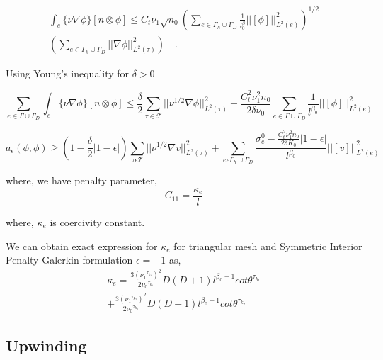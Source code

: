\documentclass[a4paper]{book}
\begin{document}
\begin{equation}
\begin{split}
\int_e \lbrace \nu \nabla \phi \rbrace[n \otimes \phi] \leq C_t \nu_1 \sqrt{n_0} \left( \sum_{e \in \Gamma_h \cup \Gamma_D} \frac{1}{l^\beta_0} ||[\phi]||^2_{L^2(e)} \right)^{1/2} \\ \left( \sum_{e \in \Gamma_h \cup \Gamma_D} ||\nabla \phi||^2_{L^2(\tau)} \right) \quad \textrm{.}
\end{split}
\end{equation}

Using Young's inequality for $\delta > 0$

\begin{equation}
\sum_{e \in \Gamma \cup \Gamma_D} \int_e \lbrace \nu \nabla \phi \rbrace [n \otimes \phi] \leq \frac{\delta}{2} \sum_{\tau \in \mathcal{T}} ||\nu^{1/2} \nabla \phi ||^2_{L^2(\tau)} +  \frac{C_t^2 \nu_1^2 n_0}{2 \delta \nu_0}  \sum_{e \in \Gamma \cup \Gamma_D} \frac{1}{l^{\beta_0}} ||[\phi]||^2_{L^2(e)}
\end{equation}


\begin{equation}
a_\epsilon (\phi , \phi) \geq \left( 1-\frac{\delta}{2} |1-\epsilon| \right) \sum_{\tau \epsilon \mathcal{T}} ||\nu^{1/2} \nabla v ||^2_{L^2(\tau)} + \sum_{e \epsilon \Gamma_h \cup \Gamma_D} \frac{\sigma_e^0 - \frac{C_t^2 \nu_1^2 n_0}{2 \delta K_0}|1-\epsilon|}{l^{\beta_0}} ||[v]||^2_{L^2(e)}
\end{equation}

where, we have penalty parameter,
\begin{equation}
C_{11} = \frac{\kappa_e}{l}
\end{equation} 

where, $\kappa_e$ is coercivity constant.

We can obtain exact expression for $\kappa_e$ for triangular mesh and Symmetric Interior Penalty Galerkin formulation $\epsilon = -1$ as,\\
\begin{equation}
\begin{split}
\kappa_e = \frac{3 ( {\nu_1}^{\tau_{k_1}})^2}{2 {\nu_0}^{\tau_{k_1}}} D (D+1) l^{\beta_0 - 1} cot {\theta^{\tau_{k_1}}}  \\ + \frac{3 ( {\nu_1}^{\tau_{k_2}})^2}{2 {\nu_0}^{\tau_{k_2}}} D (D+1) l^{\beta_0 - 1} cot {\theta^{\tau_{k_2}}}
\end{split}
\end{equation} 

\subsection{Upwinding} \label{upwinding}
\end{document}
